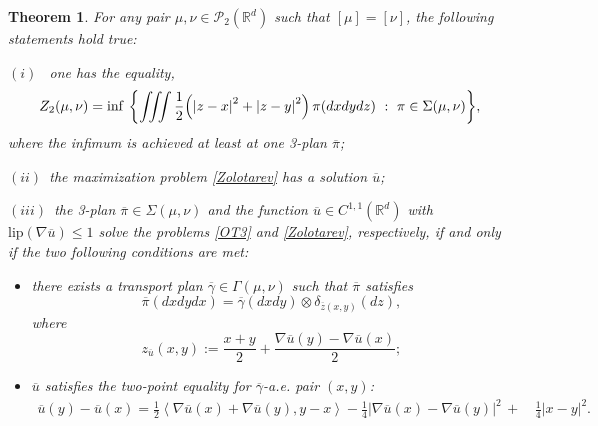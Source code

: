 \documentclass[11pt,reqno]{amsart}
\newtheorem{theorem}{Theorem}[section]
\theoremstyle{definition}
\numberwithin{equation}{section}
\newcommand{\med}{\medskip\noindent}
\newcommand{\R}{\mathbb{R}}
\newcommand{\Rd}{{\R^d}}
\newcommand{\ov}{\overline}
\newcommand{\pairing}[1]{{\left \langle #1 \right \rangle}}
\newcommand{\abs}[1]{{\left \lvert #1 \right \rvert}}
\begin{document}
\begin{theorem}
    \label{BoBo}
    For any pair $\mu,\nu \in \mathcal{P}_2(\Rd)$ such that $[\mu] = [\nu]$, the following statements hold true:
    
  \noindent $(i)$ \  one has the equality,
        \begin{equation}\label{OT3}
            Z_2(\mu,\nu) =  \inf\ 
            \biggl\{  \iiint \frac{1}{2} \Bigl( \abs{z-x}^2 + \abs{z-y}^2 \Bigr) \, \pi(dxdydz)  \ :   \ \pi\in \Sigma(\mu,\nu)\biggr\},
        \end{equation} 
        where the infimum  is achieved   at least at one 3-plan  $\ov{\pi}$;
        
    \med
    $(ii)$\  the maximization problem \eqref{Zolotarev} has a solution $\ov{u}$;
       
       \med
       $(iii)$\ the 3-plan $\ov{\pi} \in \Sigma(\mu,\nu)$ and the function $\ov{u} \in C^{1,1}(\Rd)$ with $\mathrm{lip}(\nabla \ov{u}) \leq 1$ solve the problems  \eqref{OT3} and \eqref{Zolotarev}, respectively, if and only if the two following conditions are met:
        \begin{itemize}%
            \item there exists a  transport plan $\ov\gamma \in \Gamma(\mu,\nu)$ such that $\ov{\pi}$ satisfies 
             \begin{equation}
             	\label{disintegrated}
                \ov\pi(dxdydx) = \ov\gamma(dxdy) \otimes \delta_{\ov{z}(x,y)}(dz),
            \end{equation}
            where
            \begin{equation}
                 z_{\ov u}(x,y) := \frac{x+y}{2} + \frac{\nabla \ov u(y)-\nabla \ov u(x)}{2};
            \end{equation}
            \item $\ov u$ satisfies the  two-point equality  for $\ov\gamma$-a.e. pair $(x,y)$:
            \begin{align}\label{2-eq}
            \ov{u}(y)-\ov{u}(x) = \frac{1}{2} \pairing{\nabla \ov{u}(x) + \nabla \ov{u}(y), y-x} - \frac{1}{4} |\nabla \ov{u}(x) - \nabla \ov{u}(y)|^2 \, + \, & \frac{1}{4} \abs{x-y}^2 .
                   \end{align}
        \end{itemize}
\end{theorem}
\end{document}
